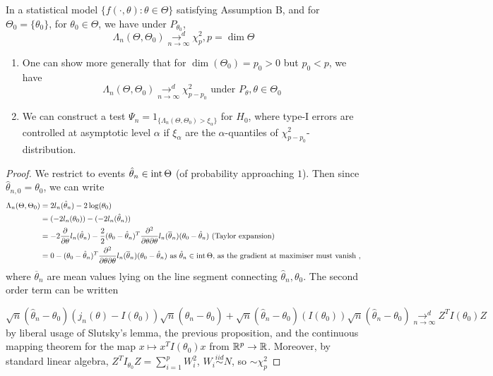 \documentclass[a4paper]{article}
\begin{document}
\begin{thm}[Wilks']
	In a statistical model $\{f\left( \cdot , \theta \right) : \theta \in \Theta \}$ satisfying Assumption B, and for $\Theta_0 = \{\theta_0\} $, for $\theta_0 \in \Theta$, we have under $P_{\theta_0}$,
	\[
		\Lambda_{n}(\Theta, \Theta_0) \underset{n\to \infty}{\to ^{d}} \chi^2_{p},p = \dim\Theta
	\] 
	
\end{thm}

\begin{remark}
	\begin{enumerate}
		\item One can show more generally that for $\dim(\Theta_0) = p_0 > 0$ but $p_0 < p$, we have
	\[
		\Lambda_{n}(\Theta, \Theta_0) \underset{n\to \infty}{\to ^{d}} \chi^2_{p-p_0} \text{ under  } P_{\theta}, \theta \in \Theta_0
	\]
\item We can construct a test $\Psi_{n} = 1_{\{ \Lambda_n (\Theta, \Theta_0) > \xi_{\alpha}\} }$ for $H_0$, where type-I errors are controlled at asymptotic level $\alpha$ if $\xi_{\alpha}$ are the $\alpha$-quantiles of  $\chi^2_{p-p_0}$-distribution.
	\end{enumerate}
\end{remark}

\begin{proof}
	We restrict to events $\hat{\theta}_n \in\operatorname{int} \Theta$ (of probability approaching $1$). Then since $\hat{\theta}_{n,0} = \theta_0$, we can write 
	\begin{align*}
		\Lambda_n(\Theta,\Theta_0) &= 2l_n(\hat{\theta}_n) - 2\log(\theta_0) \\
		&= (-2l_n(\theta_0)) -(-2l_n(\hat{\theta}_n)) \\
		&= -2 \frac{\partial }{\partial \theta} l_n(\hat{\theta}_n) - \frac{2}{2} (\theta_0 - \hat{\theta}_n)^{T} \frac{\partial ^2}{\partial \theta\partial\theta} l_n(\overline{\theta}_n)(\theta_0 - \hat{\theta}_n) \text{ (Taylor expansion)} \\ 
		&= 0 - (\theta_0 - \hat{\theta}_n)^{T} \frac{\partial ^2}{\partial \theta\partial\theta} l_n(\overline{\theta}_n)(\theta_0 - \hat{\theta}_n) \text{ as $\hat{\theta}_n \in\operatorname{int} \Theta$, as the gradient at maximiser must vanish }
	,\end{align*}
	where $\overline{\theta}_n$ are mean values lying on the line segment connecting $\hat{\theta}_n, \theta_0$. The second order term can be written

\[
	\sqrt{n}(\hat{\theta}_n - \theta_0)(j_n(\theta) - I(\theta_0))\sqrt{n}(\hat{\theta}_n - \theta_0) + \sqrt{n}(\hat{\theta}_n - \theta_0)(I(\theta_0))\sqrt{n}(\hat{\theta}_n - \theta_0) \underset{n\to \infty}{\to ^{d}} Z^{T}I(\theta_0)Z
		\]
by liberal usage of Slutsky's lemma, the previous proposition, and the continuous mapping theorem for the map $x \mapsto x^{T}I(\theta_0)x$ from $\mathbb{R}^{p} \to \mathbb{R}$. Moreover, by standard linear algebra, $Z^{T}I_{\theta_0}Z = \sum_{i=1}^{p} W_{i}^2$, $W_i \stackrel{iid}{\sim} N$, so $\sim \chi^2_{p}$ 
\end{proof}
\end{document}
